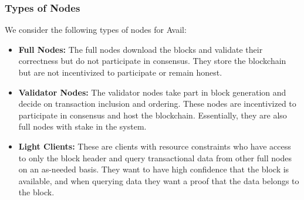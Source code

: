 \documentclass[sigconf, screen=true, nonacm]{acmart}
\newcommand{\DA}{\textit{DA layer}}
\begin{document}
        \subsubsection{Types of Nodes} 
            We consider the following types of nodes for Avail: 
            \begin{itemize}
                \item \textbf{Full Nodes:} The full nodes download the blocks and validate their correctness but do not participate in consensus. They store the blockchain but are not incentivized to participate or remain honest.
                \item \textbf{Validator Nodes:} The validator nodes take part in block generation and decide on transaction inclusion and ordering. These nodes are incentivized to participate in consensus and host the blockchain. Essentially, they are also full nodes with stake in the system. 
                \item \textbf{Light Clients:} These are clients with resource constraints who have access to only the block header and query transactional data from other full nodes on an as-needed basis. They want to have high confidence that the block is available, and when querying data they want a proof that the data belongs to the block. 
            \end{itemize}
\end{document}

